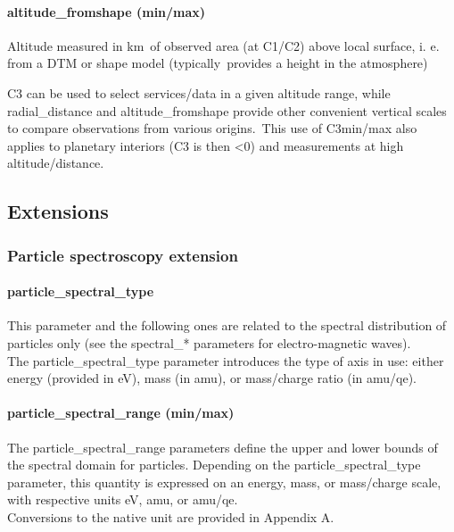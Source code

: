 \documentclass[11pt,a4paper]{ivoa}
\begin{document}
\paragraph{altitude\_fromshape (min/max)}

Altitude measured in km of observed area (at C1/C2) above local surface, i. e. from a DTM or shape model (typically provides a height in the atmosphere)

C3 can be used to select services/data in a given altitude range, while radial\_distance and altitude\_fromshape provide other convenient vertical scales to compare observations from various origins. This use of C3min/max also applies to planetary interiors (C3 is then <0) and measurements at high altitude/distance. 

\subsection{Extensions}

\subsubsection{Particle spectroscopy extension}

\paragraph{particle\_spectral\_type}

This parameter and the following ones are related to the spectral distribution of particles only (see the spectral\_* parameters for electro-magnetic waves).\\The particle\_spectral\_type parameter introduces the type of axis in use: either energy (provided in eV), mass (in amu), or mass/charge ratio (in amu/qe).

\paragraph{particle\_spectral\_range (min/max)}

The particle\_spectral\_range parameters define the upper and lower bounds of the spectral domain for particles. Depending on the particle\_spectral\_type parameter, this quantity is expressed on an energy, mass, or mass/charge scale, with respective units eV, amu, or amu/qe. \\Conversions to the native unit are provided in Appendix A.
\end{document}
